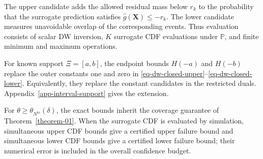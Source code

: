 \documentclass[review,11pt,3p,authoryear,nopreprintline]{elsarticle}
\begin{document}
The upper candidate adds the allowed residual mass below $r_k$ to the probability that the surrogate prediction satisfies $\hat g(\bm X)\le-r_k$. The lower candidate measures unavoidable overlap of the corresponding events. Thus evaluation consists of scalar DW inversion, $K$ surrogate CDF evaluations under $\mathbb P$, and finite minimum and maximum operations.

\begin{remark}
  \label{rem-interval-support}
  For known support $\Xi=[a,b]$, the endpoint bounds $H(-a)$ and $H(-b)$ replace the outer constants one and zero in \eqref{eq-dw-closed-upper}--\eqref{eq-dw-closed-lower}. Equivalently, they replace the constant candidates in the restricted duals. Appendix~\ref{app-interval-support} gives the extension.
\end{remark}

For $\theta\ge\theta_{N^{\mathrm{te}}}(\delta)$, the exact bounds inherit the coverage guarantee of Theorem~\ref{theorem-01}. When the surrogate CDF is evaluated by simulation, simultaneous upper CDF bounds give a certified upper failure bound and simultaneous lower CDF bounds give a certified lower failure bound; their numerical error is included in the overall confidence budget.

\appendix
{}
\renewcommand{\thelemma}{\Alph{section}.\arabic{lemma}}
\renewcommand{\thesubsection}{\Alph{section}.\arabic{subsection}}




\end{document}
